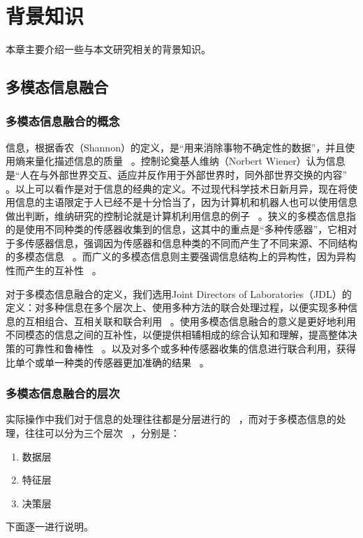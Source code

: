\chapter{背景知识}
\label{cha:background}

本章主要介绍一些与本文研究相关的背景知识。

\section{多模态信息融合}
\label{sec:sec21}

\subsection{多模态信息融合的概念}
信息，根据香农（Shannon）的定义，是“用来消除事物不确定性的数据”，并且使用熵来量化描述信息的质量~ 。控制论奠基人维纳（Norbert Wiener）认为信息是“人在与外部世界交互、适应并反作用于外部世界时，同外部世界交换的内容”~ 。以上可以看作是对于信息的经典的定义。不过现代科学技术日新月异，现在将使用信息的主语限定于人已经不是十分恰当了，因为计算机和机器人也可以使用信息做出判断，维纳研究的控制论就是计算机利用信息的例子~ 。狭义的多模态信息指的是使用不同种类的传感器收集到的信息，这其中的重点是“多种传感器”，它相对于多传感器信息，强调因为传感器和信息种类的不同而产生了不同来源、不同结构的多模态信息~ 。而广义的多模态信息则主要强调信息结构上的异构性，因为异构性而产生的互补性~ 。

对于多模态信息融合的定义，我们选用Joint Directors of Laboratories（JDL）的定义：对多种信息在多个层次上、使用多种方法的联合处理过程，以便实现多种信息的互相组合、互相关联和联合利用~ 。使用多模态信息融合的意义是更好地利用不同模态的信息之间的互补性，以便提供相辅相成的综合认知和理解，提高整体决策的可靠性和鲁棒性~ 。以及对多个或多种传感器收集的信息进行联合利用，获得比单个或单一种类的传感器更加准确的结果~ 。

\subsection{多模态信息融合的层次}
实际操作中我们对于信息的处理往往都是分层进行的~ ，而对于多模态信息的处理，往往可以分为三个层次~ ，分别是：
\begin{enumerate}
\item 数据层
\item 特征层
\item 决策层
\end{enumerate}
下面逐一进行说明。

